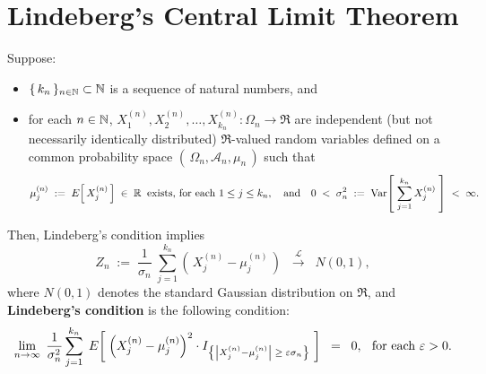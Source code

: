 

\section{Lindeberg's Central Limit Theorem}
\setcounter{theorem}{0}
\setcounter{equation}{0}

\renewcommand{\theenumi}{\alph{enumi}}
\renewcommand{\labelenumi}{\textnormal{(\theenumi)}$\;\;$}

\begin{theorem}
\mbox{}\vskip 0.2cm
\noindent
Suppose:
\begin{itemize}
\item	$\{\,k_{n}\,\}_{n\in\mathbb{N}}\subset\mathbb{N}$ is a sequence of natural numbers, and %
\item	for each $n \in \mathbb{N}$, $X^{(n)}_{1}, X^{(n)}_{2}, \ldots, X^{(n)}_{k_{n}} : \Omega_{n} \longrightarrow \Re$
		are {\color{red}independent} (but not necessarily identically distributed)
		$\Re$-valued random variables defined on a common probability space
		$\left(\,\Omega_{n},\mathcal{A}_{n},\mu_{n}\,\right)$ such that
		\begin{equation*}
		\mu^{(n)}_{j} \;:=\; E\!\left[\,X^{(n)}_{j}\,\right] \;\in\; \mathbb{R} \;\;\textnormal{exists, for each $1 \leq j \leq k_{n}$},
		\quad\textnormal{and}\quad
		0 \;<\; \sigma^{2}_{n} \;:=\; \textnormal{Var}\!\left[\;\overset{k_{n}}{\underset{j=1}{\sum}}\,X^{(n)}_{j}\;\right] \;<\; \infty.
		\end{equation*}
\end{itemize}
Then, Lindeberg's condition implies
\begin{equation*}
Z_{n} \; := \;
\dfrac{1}{\sigma_{n}}\;\sum^{k_{n}}_{j=1}\left(\,X^{(n)}_{j} - \mu^{(n)}_{j}\,\right)
\;\;\overset{\mathcal{L}}{\longrightarrow}\;\;
N(0,1),
\end{equation*}
where $N(0,1)$ denotes the standard Gaussian distribution on $\Re$,
and \textbf{Lindeberg's condition} is the following condition:
\begin{equation*}
\lim_{n\rightarrow\infty}\;
\dfrac{1}{\sigma^{2}_{n}}
\sum_{j=1}^{k_{n}}\;
E\!\left[\;
\left(X^{(n)}_{j} - \mu^{(n)}_{j}\right)^{2}
\cdot
I_{\left\{\left\vert X^{(n)}_{j} - \mu^{(n)}_{j}\right\vert \;\geq\; \varepsilon \sigma_{n}\right\}}
\;\right]
\;\;=\;\;
0,
\;\;\,
\textnormal{for each $\varepsilon > 0$}.
\end{equation*}
\end{theorem}

